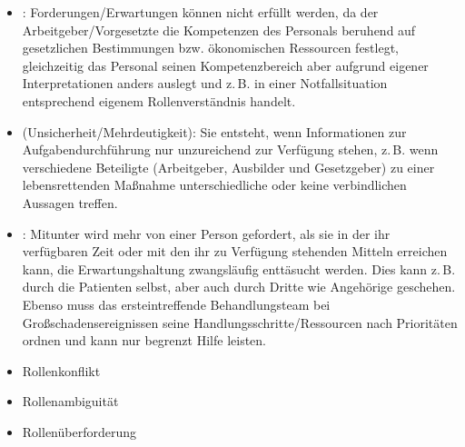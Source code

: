 {\begin{itemize}
  \item {}: Forderungen/Erwartungen können
  nicht erfüllt werden, da der Arbeitgeber/Vorgesetzte die
  Kompetenzen des Personals beruhend auf gesetzlichen
  Bestimmungen bzw. ökonomischen Ressourcen festlegt,
  gleichzeitig das Personal seinen Kompetenzbereich aber
  aufgrund eigener Interpretationen anders auslegt und
  z.\,B. in einer Notfallsituation entsprechend eigenem
  Rollenverständnis handelt.
  
  \item {} (Unsicherheit/Mehrdeutigkeit):
  Sie entsteht, wenn Informationen zur Aufgabendurchführung nur
  unzureichend zur Verfügung stehen, z.\,B. wenn
  verschiedene Beteiligte (Arbeitgeber, Ausbilder und
  Gesetzgeber) zu einer lebensrettenden Maßnahme
  unterschiedliche oder keine verbindlichen Aussagen treffen.
  
  \item {}: Mitunter wird 
  mehr von einer Person gefordert, als sie in der ihr
  verfügbaren Zeit oder mit den ihr zu Verfügung stehenden
  Mitteln erreichen kann, die Erwartungshaltung 
  zwangsläufig enttäsucht werden. Dies kann z.\,B.
  durch die Patienten selbst, aber auch durch Dritte wie Angehörige
  geschehen. Ebenso muss das
  ersteintreffende Behandlungsteam bei
  Großschadensereignissen seine Handlungsschritte/Ressourcen
  nach Prioritäten ordnen und kann nur begrenzt Hilfe
  leisten.
\end{itemize}}
{\begin{itemize}
  \item {Rollenkonflikt}
  \item {Rollenambiguität}
  \item {Rollenüberforderung}
\end{itemize}}
{}
{}
{}

